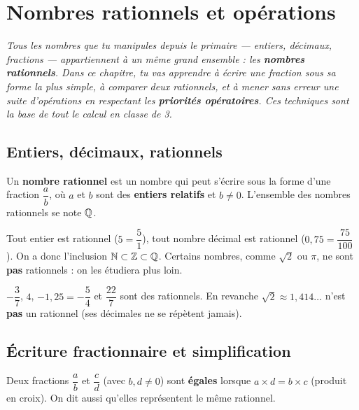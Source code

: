 \chapter{Nombres rationnels et opérations}

\noindent\textit{Tous les nombres que tu manipules depuis le primaire — entiers, décimaux,
fractions — appartiennent à un même grand ensemble : les \textbf{nombres rationnels}. Dans ce
chapitre, tu vas apprendre à écrire une fraction sous sa forme la plus simple, à comparer deux
rationnels, et à mener sans erreur une suite d'opérations en respectant les \textbf{priorités
opératoires}. Ces techniques sont la base de tout le calcul en classe de 3\ieme{}.}
\vspace{8pt}

\connecteBanner

\section{Entiers, décimaux, rationnels}

\begin{definition}
Un \textbf{nombre rationnel} est un nombre qui peut s'écrire sous la forme d'une fraction
$\dfrac{a}{b}$, où $a$ et $b$ sont des \textbf{entiers relatifs} et $b\ne0$. L'ensemble des
nombres rationnels se note $\mathbb{Q}$.
\end{definition}

\begin{remarque}
Tout entier est rationnel ($5=\dfrac51$), tout nombre décimal est rationnel
($0{,}75=\dfrac{75}{100}$). On a donc l'inclusion $\mathbb{N}\subset\mathbb{Z}\subset\mathbb{Q}$. Certains nombres,
comme $\sqrt2$ ou $\pi$, ne sont \textbf{pas} rationnels : on les étudiera plus loin.
\end{remarque}

\begin{exemple}
$-\dfrac37$, $4$, $-1{,}25=-\dfrac54$ et $\dfrac{22}{7}$ sont des rationnels. En revanche
$\sqrt2\approx1{,}414\ldots$ n'est \textbf{pas} un rationnel (ses décimales ne se répètent
jamais).
\end{exemple}

\section{Écriture fractionnaire et simplification}

\begin{definition}
Deux fractions $\dfrac ab$ et $\dfrac cd$ (avec $b,d\ne0$) sont \textbf{égales} lorsque
$a\times d=b\times c$ (produit en croix). On dit aussi qu'elles représentent le même
rationnel.
\end{definition}

